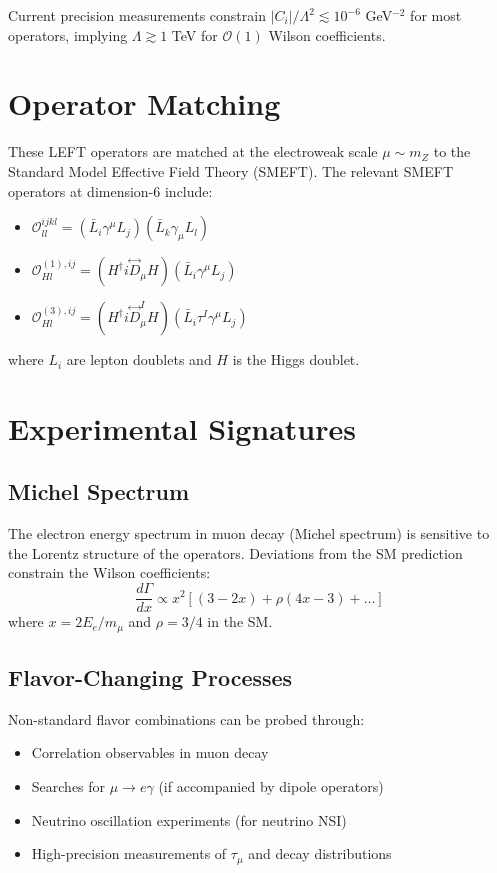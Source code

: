 \documentclass[11pt,a4paper]{article}
\begin{document}
Current precision measurements constrain $|C_i|/\Lambda^2 \lesssim 10^{-6}$ GeV$^{-2}$ for most operators, implying $\Lambda \gtrsim 1$ TeV for $\mathcal{O}(1)$ Wilson coefficients.

\section{Operator Matching}

These LEFT operators are matched at the electroweak scale $\mu \sim m_Z$ to the Standard Model Effective Field Theory (SMEFT). The relevant SMEFT operators at dimension-6 include:
\begin{itemize}
\item $\mathcal{O}_{ll}^{ijkl} = (\bar{L}_i \gamma^\mu L_j)(\bar{L}_k \gamma_\mu L_l)$
\item $\mathcal{O}_{Hl}^{(1),ij} = (H^\dagger i\overset{\leftrightarrow}{D}_\mu H)(\bar{L}_i \gamma^\mu L_j)$
\item $\mathcal{O}_{Hl}^{(3),ij} = (H^\dagger i\overset{\leftrightarrow}{D}_\mu^I H)(\bar{L}_i \tau^I \gamma^\mu L_j)$
\end{itemize}
where $L_i$ are lepton doublets and $H$ is the Higgs doublet.

\section{Experimental Signatures}

\subsection{Michel Spectrum}

The electron energy spectrum in muon decay (Michel spectrum) is sensitive to the Lorentz structure of the operators. Deviations from the SM prediction constrain the Wilson coefficients:
\begin{equation}
\frac{d\Gamma}{dx} \propto x^2\left[(3-2x) + \rho(4x-3) + \ldots\right]
\end{equation}
where $x = 2E_e/m_\mu$ and $\rho = 3/4$ in the SM.

\subsection{Flavor-Changing Processes}

Non-standard flavor combinations can be probed through:
\begin{itemize}
\item Correlation observables in muon decay
\item Searches for $\mu \to e \gamma$ (if accompanied by dipole operators)
\item Neutrino oscillation experiments (for neutrino NSI)
\item High-precision measurements of $\tau_\mu$ and decay distributions
\end{itemize}
\end{document}
